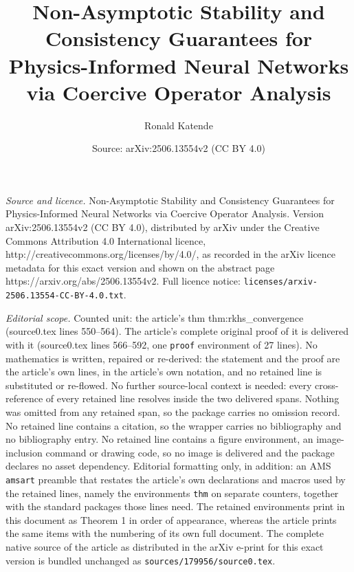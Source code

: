 \documentclass[10pt,a4paper]{amsart}
\title{Non-Asymptotic Stability and Consistency Guarantees for Physics-Informed Neural Networks via Coercive Operator Analysis}
\author{Ronald Katende}
\date{Source: arXiv:2506.13554v2 (CC BY 4.0)}
\begin{document}
\maketitle

\noindent\emph{Source and licence.} Non-Asymptotic Stability and Consistency Guarantees for Physics-Informed Neural Networks via Coercive Operator Analysis. Version arXiv:2506.13554v2 (CC BY 4.0), distributed by arXiv under the Creative Commons Attribution 4.0 International licence, http://creativecommons.org/licenses/by/4.0/, as recorded in the arXiv licence metadata for this exact version and shown on the abstract page https://arxiv.org/abs/2506.13554v2. Full licence notice: \texttt{licenses/arxiv-2506.13554-CC-BY-4.0.txt}.\par\smallskip

\noindent\textit{Editorial scope.} Counted unit: the article's thm thm:rkhs\_convergence (source0.tex lines 550--564). The article's complete original proof of it is delivered with it (source0.tex lines 566--592, one \texttt{proof} environment of 27 lines). No mathematics is written, repaired or re-derived: the statement and the proof are the article's own lines, in the article's own notation, and no retained line is substituted or re-flowed.  No further source-local context is needed: every cross-reference of every retained line resolves inside the two delivered spans.  Nothing was omitted from any retained span, so the package carries no omission record.  No retained line contains a citation, so the wrapper carries no bibliography and no bibliography entry.  No retained line contains a figure environment, an image-inclusion command or drawing code, so no image is delivered and the package declares no asset dependency.  Editorial formatting only, in addition: an AMS \texttt{amsart} preamble that restates the article's own declarations and macros used by the retained lines, namely the environments \texttt{thm} on separate counters, together with the standard packages those lines need.  The retained environments print in this document as Theorem 1 in order of appearance, whereas the article prints the same items with the numbering of its own full document.  The complete native source of the article as distributed in the arXiv e-print for this exact version is bundled unchanged as \texttt{sources/179956/source0.tex}.
\end{document}
